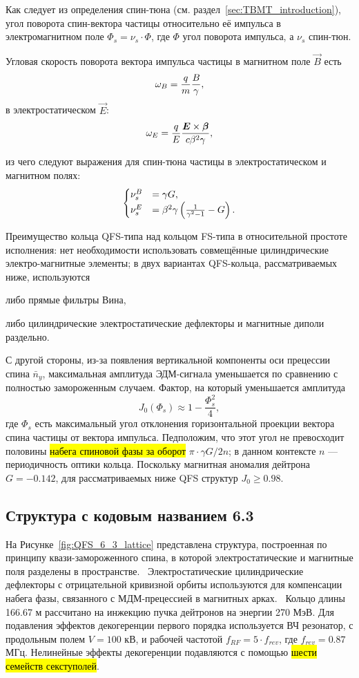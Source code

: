 Как следует из определения спин-тюна (см. раздел~\ref{sec:TBMT_introduction}), угол поворота спин-вектора частицы относительно её импульса в электромагнитном поле $\Phi_s = \nu_s \cdot \Phi$, где $\Phi$ угол поворота импульса, а $\nu_s$ спин-тюн.

Угловая скорость поворота вектора импульса частицы в магнитном поле $\vec B$ есть 
\[
\omega_B = \frac qm \frac B \gamma,
\]
в электростатическом $\vec E$:
\[
\omega_E = \frac qE \frac{\boldsymbol E\times \boldsymbol\beta}{c\beta^2\gamma},
\]

из чего следуют выражения для спин-тюна частицы в электростатическом и магнитном полях:
\begin{equation}
	\begin{cases}
		\nu_s^B &= \gamma G, \\
		\nu_s^E &= \beta^2\gamma\bkt{\frac{1}{\gamma^2-1} - G}.
	\end{cases}
\end{equation}

Преимущество кольца QFS-типа над кольцом FS-типа в относительной простоте исполнения: нет необходимости использовать совмещённые цилиндрические электро-магнитные элементы; в двух вариантах QFS-кольца, рассматриваемых ниже, используются 
\begin{enumerate*}
\item либо прямые фильтры Вина, 
\item либо цилиндрические электростатические дефлекторы и магнитные диполи раздельно.
\end{enumerate*}
С другой стороны, из-за появления вертикальной компоненты оси прецессии спина $\bar n_y$, максимальная амплитуда ЭДМ-сигнала уменьшается по сравнению с полностью замороженным случаем. Фактор, на который уменьшается амплитуда~\cite{Senichev:QFS_IPAC15}
\[
J_0(\Phi_s) \approx 1 - \frac{\Phi_s^2}{4},
\]
где $\Phi_s$ есть максимальный угол отклонения горизонтальной проекции вектора спина частицы от вектора импульса. Педположим, что этот угол не превосходит половины \hl{набега спиновой фазы за оборот} $\pi\cdot \gamma G/2n$; в данном контексте $n$ --- периодичность оптики кольца. Поскольку магнитная аномалия дейтрона $G = -0.142$, для рассматриваемых ниже QFS структур $J_0\ge 0.98$.

\subsection{Структура с кодовым названием 6.3}\label{sec:QFS_6_3_lattice}

На Рисунке~\ref{fig:QFS_6_3_lattice} представлена структура, построенная по принципу квази-замороженного спина, в которой электростатические и магнитные поля разделены в пространстве.~\cite{Senichev:Lattices} Электростатические цилиндрические дефлекторы с отрицательной кривизной орбиты используются для компенсации набега фазы, связанного с МДМ-прецессией в магнитных арках.~\cite{Senichev:QFS_IPAC15} Кольцо длины 166.67 м рассчитано на инжекцию пучка дейтронов на энергии 270 МэВ. Для подавления эффектов декогеренции первого порядка используется ВЧ резонатор, с продольным полем $V = 100$ кВ, и рабочей частотой $f_{RF} = 5\cdot f_{rev}$, где $f_{rev} = 0.87$ МГц. Нелинейные эффекты декогеренции подавляются с помощью \hl{шести семейств секступолей}.


